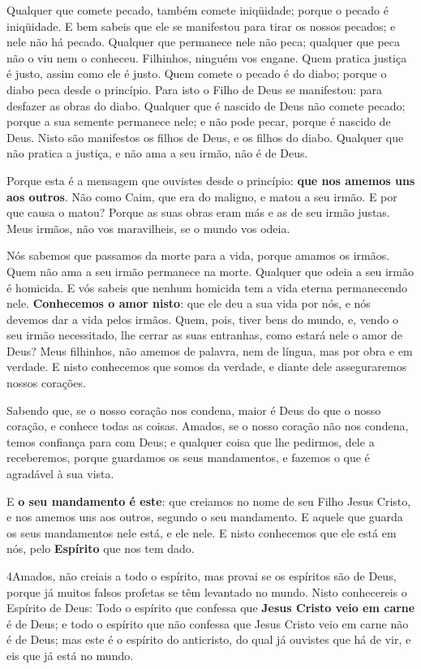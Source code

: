 Qualquer que comete pecado, também comete iniqüidade; porque o
pecado é iniqüidade. E bem sabeis que ele se manifestou para
tirar os nossos pecados; e nele não há pecado. Qualquer que
permanece nele não peca; qualquer que peca não o viu nem o conheceu.
Filhinhos, ninguém vos engane. Quem pratica justiça é justo,
assim como ele é justo. Quem comete o pecado é do diabo; porque
o diabo peca desde o princípio. Para isto o Filho de Deus se
manifestou: para desfazer as obras do diabo. Qualquer que é
nascido de Deus não comete pecado; porque a sua semente permanece
nele; e não pode pecar, porque é nascido de Deus. Nisto são
manifestos os filhos de Deus, e os filhos do diabo. Qualquer que não
pratica a justiça, e não ama a seu irmão, não é de Deus.

Porque esta é a mensagem que ouvistes desde o princípio:
\textbf{que nos amemos uns aos outros}. Não como Caim, que
era do maligno, e matou a seu irmão. E por que causa o matou? Porque
as suas obras eram más e as de seu irmão justas. Meus irmãos,
não vos maravilheis, se o mundo vos odeia.

Nós sabemos que passamos da morte para a vida, porque amamos os
irmãos. Quem não ama a seu irmão permanece na morte. Qualquer
que odeia a seu irmão é homicida. E vós sabeis que nenhum homicida
tem a vida eterna permanecendo nele. \textbf{Conhecemos o
amor nisto}: que ele deu a sua vida por nós, e nós devemos dar a
vida pelos irmãos. Quem, pois, tiver bens do mundo, e, vendo
o seu irmão necessitado, lhe cerrar as suas entranhas, como estará
nele o amor de Deus? Meus filhinhos, não amemos de palavra,
nem de língua, mas por obra e em verdade. E nisto conhecemos
que somos da verdade, e diante dele asseguraremos nossos corações.

Sabendo que, se o nosso coração nos condena, maior é Deus do que
o nosso coração, e conhece todas as coisas. Amados, se o
nosso coração não nos condena, temos confiança para com Deus;
e qualquer coisa que lhe pedirmos, dele a receberemos, porque
guardamos os seus mandamentos, e fazemos o que é agradável à sua
vista.

E \textbf{o seu mandamento é este}: que creiamos no nome de seu
Filho Jesus Cristo, e nos amemos uns aos outros, segundo o seu
mandamento. E aquele que guarda os seus mandamentos nele
está, e ele nele. E nisto conhecemos que ele está em nós, pelo
\textbf{Espírito} que nos tem dado.

\medskip

\lettrine{4} Amados, não creiais a todo o espírito, mas provai
se os espíritos são de Deus, porque já muitos falsos profetas se têm
levantado no mundo. Nisto conhecereis o Espírito de Deus: Todo o
espírito que confessa que \textbf{Jesus Cristo veio em carne} é de
Deus; e todo o espírito que não confessa que Jesus Cristo veio
em carne não é de Deus; mas este é o espírito do anticristo, do qual
já ouvistes que há de vir, e eis que já está no mundo.

